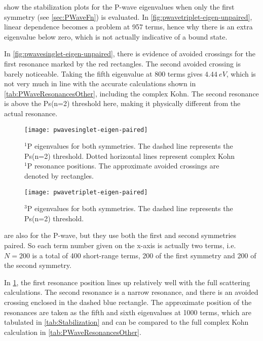 \documentclass[Dissertation.tex]{subfiles}
\begin{document}
 show 
the stabilization plots for the P-wave eigenvalues when only the first 
symmetry (see \cref{sec:PWaveFn}) is evaluated. %
In \cref{fig:pwavetriplet-eigen-unpaired}, linear dependence becomes a 
problem at 957 terms, hence why there is an extra eigenvalue below
zero, which is not actually indicative of a bound state.

In \cref{fig:pwavesinglet-eigen-unpaired}, there is evidence of avoided 
crossings for the first resonance marked by the red rectangles. The second 
avoided crossing is barely noticeable. Taking the fifth eigenvalue at 800 
terms gives $\SI{4.44}{eV}$, which is not very much in line with the accurate 
calculations shown in \cref{tab:PWaveResonancesOther}, including the complex 
Kohn. The second resonance is above the Ps(n=2) threshold here, making it 
physically different from the actual resonance.

\begin{figure}
	\centering
	\texttt{[image: pwavesinglet-eigen-paired]}
	\caption[$^1$P eigenvalues for both symmetries]{$^1$P eigenvalues for both symmetries. The dashed line represents the Ps(n=2) threshold. Dotted horizontal lines represent complex Kohn $^1$P resonance positions. The approximate avoided crossings are denoted by rectangles.}
	\label{fig:pwavesinglet-eigen-paired}
\end{figure}

\begin{figure}
	\centering
	\texttt{[image: pwavetriplet-eigen-paired]}
	\caption[$^3$P eigenvalues for both symmetries]{$^3$P eigenvalues for both symmetries. The dashed line represents the Ps(n=2) threshold.}
	\label{fig:pwavetriplet-eigen-paired}
\end{figure}

 are also 
for the P-wave, but they use both the first and second symmetries paired. So 
each term number given on the x-axis is actually two terms, i.e. $N = 200$ is 
a total of 400 short-range terms, 200 of the first symmetry and 200 of the 
second symmetry. %

In \cref{fig:pwavesinglet-eigen-paired}, the first resonance position lines 
up relatively well with the full scattering calculations. The second 
resonance is a narrow resonance, and there is an avoided crossing enclosed in 
the dashed blue rectangle. The approximate position of the resonances are 
taken as the fifth and sixth eigenvalues at 1000 terms, which are tabulated 
in \cref{tab:Stabilization} and can be compared to the full complex Kohn 
calculation in \cref{tab:PWaveResonancesOther}.
\end{document}

